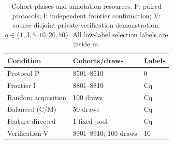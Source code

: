 \begin{table}[t]
\caption{Cohort phases and annotation resources. P: paired protocols; I: independent frontier confirmation; V: source-disjoint private-verification demonstration. $q\in\{1,3,5,10,20,50\}$. All low-label selection labels are inside m.}
\label{tab:resource-map}\small
\centering
\begin{tabular}{@{}lll@{}}\toprule
Condition & Cohorts/draws & Labels \\
\midrule
Protocol P & 8501--8510 & 0 \\
Frontier I & 8801--8810 & Cq \\
Random acquisition & 100 draws & Cq \\
Balanced (C/M) & 50 draws & Cq \\
Feature-directed & 1 fixed pool & Cq \\
Verification V & 8901--8910; 100 draws & 10 \\
\bottomrule\end{tabular}
\end{table}
